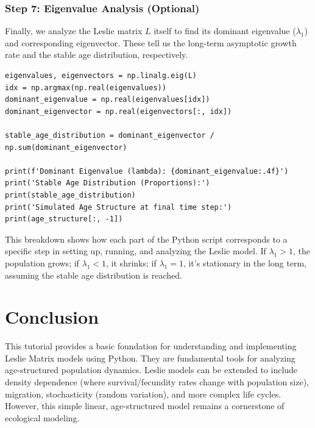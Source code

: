 \documentclass{article}
\begin{document}
\subsubsection{Step 7: Eigenvalue Analysis (Optional)}
Finally, we analyze the Leslie matrix $L$ itself to find its dominant eigenvalue ($\lambda_1$) and corresponding eigenvector. These tell us the long-term asymptotic growth rate and the stable age distribution, respectively.
\begin{lstlisting}[caption={Eigenvalue analysis of the Leslie Matrix}]
eigenvalues, eigenvectors = np.linalg.eig(L)
idx = np.argmax(np.real(eigenvalues))
dominant_eigenvalue = np.real(eigenvalues[idx])
dominant_eigenvector = np.real(eigenvectors[:, idx])

stable_age_distribution = dominant_eigenvector / np.sum(dominant_eigenvector)

print(f'Dominant Eigenvalue (lambda): {dominant_eigenvalue:.4f}')
print('Stable Age Distribution (Proportions):')
print(stable_age_distribution)
print('Simulated Age Structure at final time step:')
print(age_structure[:, -1])
\end{lstlisting}

This breakdown shows how each part of the Python script corresponds to a specific step in setting up, running, and analyzing the Leslie model. If $\lambda_1 > 1$, the population grows; if $\lambda_1 < 1$, it shrinks; if $\lambda_1 = 1$, it's stationary in the long term, assuming the stable age distribution is reached.

\section{Conclusion}

This tutorial provides a basic foundation for understanding and implementing Leslie Matrix models using Python. They are fundamental tools for analyzing age-structured population dynamics. Leslie models can be extended to include density dependence (where survival/fecundity rates change with population size), migration, stochasticity (random variation), and more complex life cycles. However, this simple linear, age-structured model remains a cornerstone of ecological modeling.
\end{document}
